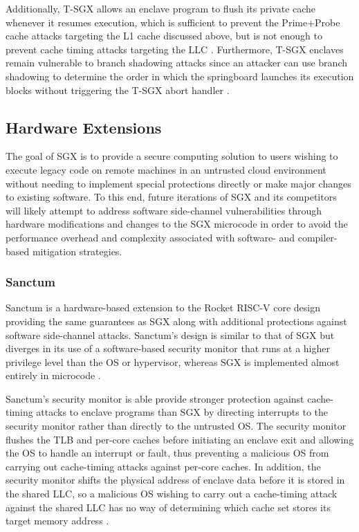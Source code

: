 Additionally, T-SGX allows an enclave program to flush its private cache whenever it resumes execution, which is sufficient to prevent the Prime+Probe cache attacks targeting the L1 cache discussed above, but is not enough to prevent cache timing attacks targeting the LLC \cite{shih_t-sgx:_2017}. Furthermore, T-SGX enclaves remain vulnerable to branch shadowing attacks since an attacker can use branch shadowing to determine the order in which the springboard launches its execution blocks without triggering the T-SGX abort handler \cite{lee_inferring_2017}.

\subsection{Hardware Extensions}

The goal of SGX is to provide a secure computing solution to users wishing to execute legacy code on remote machines in an untrusted cloud environment without needing to implement special protections directly or make major changes to existing software. To this end, future iterations of SGX and its competitors will likely attempt to address software side-channel vulnerabilities through hardware modifications and changes to the SGX microcode in order to avoid the performance overhead and complexity associated with software- and compiler-based mitigation strategies. 

\subsubsection{Sanctum}

Sanctum is a hardware-based extension to the Rocket RISC-V core design providing the same guarantees as SGX along with additional protections against software side-channel attacks. Sanctum's design is similar to that of SGX but diverges in its use of a software-based security monitor that runs at a higher privilege level than the OS or hypervisor, whereas SGX is implemented almost entirely in microcode \cite{intel_corporation_intel_2016, costan_intel_2016, costan_sanctum:_2016, costan_sanctum:_2015}. 

Sanctum's security monitor is able provide stronger protection against cache-timing attacks to enclave programs than SGX by directing interrupts to the security monitor rather than directly to the untrusted OS. The security monitor flushes the TLB and per-core caches before initiating an enclave exit and allowing the OS to handle an interrupt or fault, thus preventing a malicious OS from carrying out cache-timing attacks against per-core caches. In addition, the security monitor shifts the physical address of enclave data before it is stored in the shared LLC, so a malicious OS wishing to carry out a cache-timing attack against the shared LLC has no way of determining which cache set stores its target memory address \cite{costan_sanctum:_2016, costan_sanctum:_2015}.


